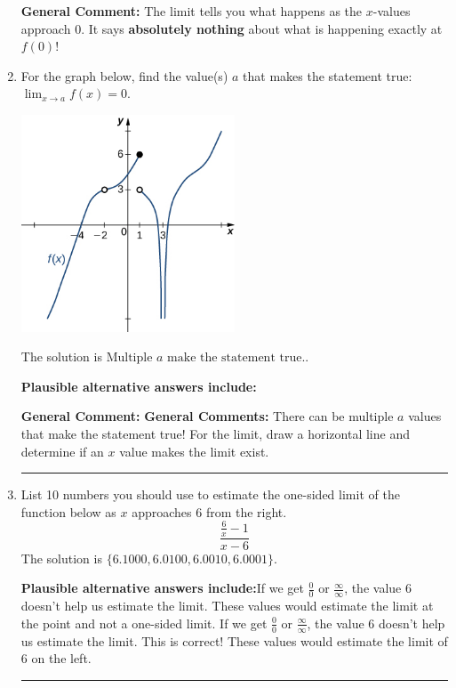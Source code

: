 \documentclass{extbook}[14pt]
\newcommand{\litem}[1]{\item #1

\rule{\textwidth}{0.4pt}}
\begin{document}
\begin{enumerate}
{\begin{enumerate}[label=\Alph*.]
\end{enumerate}

\textbf{General Comment:} The limit tells you what happens as the $x$-values approach $0$. It says \textbf{absolutely nothing} about what is happening exactly at $f(0)$!
}
\litem{
For the graph below, find the value(s) $a$ that makes the statement true: $ \displaystyle \lim_{x \rightarrow a} f(x) = 0$.

\begin{center}
    \includegraphics[width=0.5\textwidth]{../Figures/evaluateLimitGraphicallyA.png}
\end{center}


The solution is \( \text{Multiple } a \text{ make the statement true}. \).\begin{enumerate}[label=\Alph*.]
\textbf{Plausible alternative answers include:}




\end{enumerate}

\textbf{General Comment:} \textbf{General Comments:} There can be multiple $a$ values that make the statement true! For the limit, draw a horizontal line and determine if an $x$ value makes the limit exist.
}
\litem{
List 10 numbers you should use to estimate the one-sided limit of the function below as $x$ approaches 6 from the right.
\[ \frac{\frac{6}{x} - 1}{x - 6} \]The solution is \( \{ 6.1000, 6.0100, 6.0010, 6.0001 \} \).\begin{enumerate}[label=\Alph*.]
\textbf{Plausible alternative answers include:}If we get $\frac{0}{0}$ or $\frac{\infty}{\infty}$, the value 6 doesn't help us estimate the limit.
These values would estimate the limit at the point and not a one-sided limit.
If we get $\frac{0}{0}$ or $\frac{\infty}{\infty}$, the value 6 doesn't help us estimate the limit.
This is correct!
These values would estimate the limit of 6 on the left.
\end{enumerate}

}
\end{enumerate}
\end{document}
